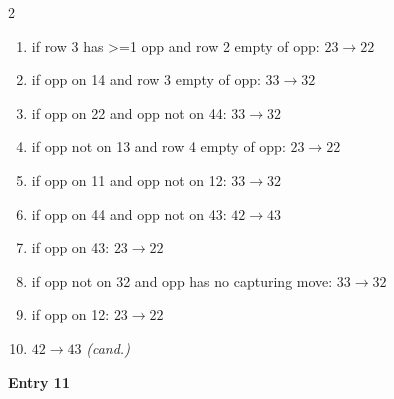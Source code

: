\begin{multicols}{2}
\begin{tikzpicture}[scale=0.24]
\end{tikzpicture}
\nopagebreak\begin{enumerate}[topsep=1pt,itemsep=0pt,parsep=0pt,leftmargin=2.2em,label=\arabic*.]
\item if row 3 has >=1 opp and row 2 empty of opp: $23\!\to\!22$
\item if opp on 14 and row 3 empty of opp: $33\!\to\!32$
\item if opp on 22 and opp not on 44: $33\!\to\!32$
\item if opp not on 13 and row 4 empty of opp: $23\!\to\!22$
\item if opp on 11 and opp not on 12: $33\!\to\!32$
\item if opp on 44 and opp not on 43: $42\!\to\!43$
\item if opp on 43: $23\!\to\!22$
\item if opp not on 32 and opp has no capturing move: $33\!\to\!32$
\item if opp on 12: $23\!\to\!22$
\item $42\!\to\!43$ \hfill\textit{(cand.)}
\end{enumerate}\smallskip
\noindent\textbf{Entry 11} \; 
\end{multicols}
